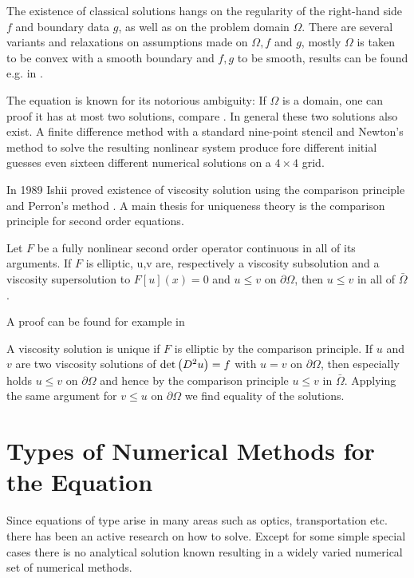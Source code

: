 The existence of classical solutions hangs on the regularity of the right-hand side $f$ and boundary data $g$, as well as on the problem domain $\Omega$. There are several variants and relaxations on assumptions made on $\Omega,f$ and $g$, mostly $\Omega$ is taken to be convex with a smooth boundary and $f,g$ to be smooth, results can be found e.g. in \cite{Gutierrez2001, GT1983, Urbas1998}.

The \MA equation is known for its notorious ambiguity: If $\Omega$ is a domain, one can proof it has at most two solutions, compare \cite[Kap.IV, \S 5,3]{CH1968}. In general these two solutions also exist.
A finite difference method with a standard nine-point stencil and Newton's method to solve the resulting nonlinear system produce fore different initial guesses even sixteen different numerical solutions on a $4 \times 4$ grid\cite{FGN2013}. 

In 1989 Ishii proved existence of viscosity solution using the comparison principle and Perron's method \cite{Ishii1989}. 
A main thesis for uniqueness theory is the comparison principle for second order equations.

\begin{theorem}
	Let $F$ be a fully nonlinear second order operator continuous in all of its arguments.
	If $F$ is elliptic,	u,v are, respectively a viscosity subsolution and a viscosity supersolution to $F[u](x)=0$ and $u \leq v$ on $\partial \Omega$, then $u \leq v$ in all of $\bar \Omega$.
\end{theorem}
A proof can be found for example in \cite[Theorem 17.1]{GT1983}

A viscosity solution is unique if $F$ is elliptic by the comparison principle. If $u$ and $v$ are two viscosity solutions of $\det{\left(D^2 u\right)}=f$ with $u=v$ on $\partial \Omega$, then especially holds $u \leq v$ on $\partial \Omega$ and hence by the comparison principle $u \leq v$ in  $\bar \Omega$. Applying the same argument for $v \leq u$ on $\partial \Omega$ we find equality of the solutions.


\section{Types of Numerical Methods for the \MA Equation}
Since equations of \MA type arise in many areas such as optics, transportation etc. there has been an active research on how to solve. Except for some simple special cases there is no analytical solution known resulting in a widely varied numerical set of numerical methods.

